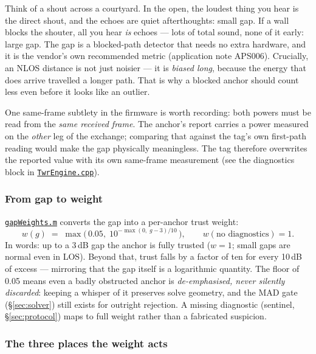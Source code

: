 \documentclass[11pt,a4paper]{article}
\newcommand{\gh}[2]{\href{https://github.com/AdershM-2/UWB_3/blob/main/#1}{\texttt{#2}}}
\begin{document}
\begin{plainwords}
Think of a shout across a courtyard. In the open, the loudest thing you hear is the
direct shout, and the echoes are quiet afterthoughts: small gap. If a wall blocks
the shouter, all you hear \emph{is} echoes --- lots of total sound, none of it
early: large gap. The gap is a blocked-path detector that needs no extra hardware,
and it is the vendor's own recommended metric (application note APS006). Crucially,
an NLOS distance is not just noisier --- it is \emph{biased long}, because the
energy that does arrive travelled a longer path. That is why a blocked anchor
should count less even before it looks like an outlier.
\end{plainwords}

One same-frame subtlety in the firmware is worth recording: both powers must be
read from the \emph{same received frame}. The anchor's report carries a power
measured on the \emph{other} leg of the exchange; comparing that against the tag's
own first-path reading would make the gap physically meaningless. The tag therefore
overwrites the reported value with its own same-frame measurement (see the
diagnostics block in \gh{libraries/UwbRtls/src/TwrEngine.cpp}{TwrEngine.cpp}).

\subsubsection{From gap to weight}

\gh{matlab/+dune/gapWeights.m}{gapWeights.m} converts the gap into a per-anchor
trust weight:
\begin{equation}
w(g) \;=\;
\max\!\Big(\,0.05,\; 10^{-\max(0,\; g - 3)/10}\,\Big),
\qquad w(\text{no diagnostics}) = 1 .
\end{equation}
In words: up to a 3\,dB gap the anchor is fully trusted ($w{=}1$; small gaps are
normal even in LOS). Beyond that, trust falls by a factor of ten for every 10\,dB
of excess --- mirroring that the gap itself is a logarithmic quantity. The floor of
0.05 means even a badly obstructed anchor is \emph{de-emphasised, never silently
discarded}: keeping a whisper of it preserves solve geometry, and the MAD gate
(\S\ref{sec:solver}) still exists for outright rejection. A missing diagnostic
(sentinel, \S\ref{sec:protocol}) maps to full weight rather than a fabricated
suspicion.

\subsubsection{The three places the weight acts}
\end{document}
